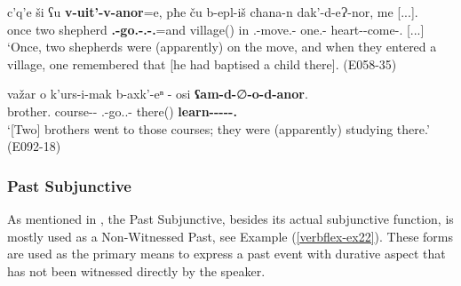 \begin{exe}
	\ex\label{verbflex-ex27}
	\begin{xlist}
		
		
			\ex\label{verbflex-ex27a}
			\gll c'q'e ši ʕu \textbf{v-uit'-v-anor}=e, pħe ču b-epl-iš cħana-n dak'-d-eɁ-nor, me [...]. \\
			once two shepherd \textbf{{\M}.{\Sg}-go.{\Imprf}-{\M}.{\Sg}-{\Nw}.{\Imprf}}=and village({\Lat}) in {\M}.{\Pl}-move.{\Ipfv}-{\Simul} one.{\Obl}-{\Dat} heart-{\D}-come-{\Nw}.{\Rem} {\Subord} [...]\\
			\trans `Once, two shepherds were (apparently) on the move, and when they entered a village, one remembered that [he had baptised a child there].
			\hfill (E058-35)
		
		
		
			\ex\label{verbflex-ex27b}
			\gll važar o k'urs-i-mak b-axk'-eⁿ - osi \textbf{ʕam-d-}∅\textbf{-o-d-anor}. \\
			brother.{\Pl} {\Dist} course-{\Pl}-{\Superlat} {\M}.{\Pl}-go.{\Pfv}.{\Pl}-{\Aor} {} there({\Ess}) \textbf{learn-{\D}-{\Tr}-{\Npst}-{\D}-{\Nw}.{\Imprf}} \\
			\trans `[Two] brothers went to those courses; they were (apparently) studying there.'
			\hfill (E092-18)
		
		
	\end{xlist}
\end{exe}


\subsubsection{Past Subjunctive}

As mentioned in , the Past Subjunctive, besides its actual subjunctive function, is mostly used as a Non-Witnessed Past, see Example (\ref{verbflex-ex22}). These forms are used as the primary means to express a past event with durative aspect that has not been witnessed directly by the speaker. 

